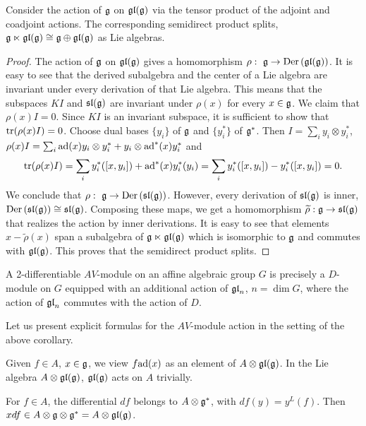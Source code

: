 \documentclass[12pt]{amsart}
\begin{document}
\begin{proposition}
\label{splits}
Consider the action of $\mathfrak{g}$ on $\mathfrak{gl}(\mathfrak{g})$ via the tensor product of the adjoint and coadjoint actions. The corresponding semidirect product splits, $\mathfrak{g} \ltimes \mathfrak{gl}(\mathfrak{g}) \cong \mathfrak{g} \oplus \mathfrak{gl}(\mathfrak{g})$ as Lie algebras.
\end{proposition}
\begin{proof}
The action of $\mathfrak{g}$ on $\mathfrak{gl}(\mathfrak{g})$ gives a homomorphism $\rho: \ \mathfrak{g} \rightarrow \textup{Der\,} (\mathfrak{gl}(\mathfrak{g}))$. It is easy to see that the derived subalgebra and the center of a Lie algebra are invariant under every derivation of that Lie algebra. This means that the subspaces $K I$ and $\mathfrak{sl}(\mathfrak{g})$ are invariant under $\rho(x)$ for every $x \in \mathfrak{g}$.
We claim that $\rho(x) I = 0$. Since $K I$ is an invariant subspace, it is sufficient to show that $\textup{tr} (\rho(x) I) = 0$.
Choose dual bases $\{y_i\}$ of $\mathfrak{g}$ and $\{y_i^*\}$ of $\mathfrak{g}^*$. Then $I = \sum_i y_i \otimes y_i^*$, 
$\rho(x) I = \sum_i \textup{ad}(x) y_i \otimes y_i^* + y_i \otimes \textup{ad}^*(x) y_i^*$ and
$$\textup{tr}(\rho(x) I ) = \sum_i y_i^* ([x,y_i]) + \textup{ad}^*(x) y_i^*(y_i)
= \sum_i y_i^* ([x,y_i]) - y_i^* ([x,y_i]) = 0.$$
We conclude that $\rho: \ \mathfrak{g} \rightarrow \textup{Der\,} (\mathfrak{sl}(\mathfrak{g}))$. However, every derivation of $\mathfrak{sl}(\mathfrak{g})$ is inner,
$\textup{Der\,} (\mathfrak{sl}(\mathfrak{g})) \cong \mathfrak{sl}(\mathfrak{g})$. Composing these maps, we get a homomorphism $\widetilde\rho: \mathfrak{g} \rightarrow \mathfrak{sl}(\mathfrak{g})$ that realizes the action by inner derivations. It is easy to see that elements $x - \widetilde\rho(x)$ span a subalgebra of $\mathfrak{g} \ltimes \mathfrak{gl}(\mathfrak{g})$ which is isomorphic to $\mathfrak{g}$ and commutes with $\mathfrak{gl}(\mathfrak{g})$. This proves that the semidirect product splits.
\end{proof}

\begin{corollary}
A 2-differentiable $AV$-module on an affine algebraic group $G$ is precisely a $D$-module on $G$ equipped with an additional action of $\mathfrak{gl}_n$, $n = \dim G$, where the action of $\mathfrak{gl}_n$ commutes with the action of $D$.
\end{corollary}

Let us present explicit formulas for the $AV$-module action in the setting of the above corollary.

Given $f \in A$, $x \in \mathfrak{g}$, we view
$f \textup{ad}(x)$ as an element of $A \otimes \mathfrak{gl}(\mathfrak{g})$. In the Lie algebra $A \otimes \mathfrak{gl}(\mathfrak{g})$, $\mathfrak{gl}(\mathfrak{g})$ acts on $A$ trivially. 

For $f \in A$, the differential $df$ belongs to $A \otimes \mathfrak{g}^*$, with $df (y) = y^L(f)$. 
Then $x df \in A \otimes \mathfrak{g} \otimes \mathfrak{g}^* = A \otimes \mathfrak{gl}(\mathfrak{g})$.
\end{document}
